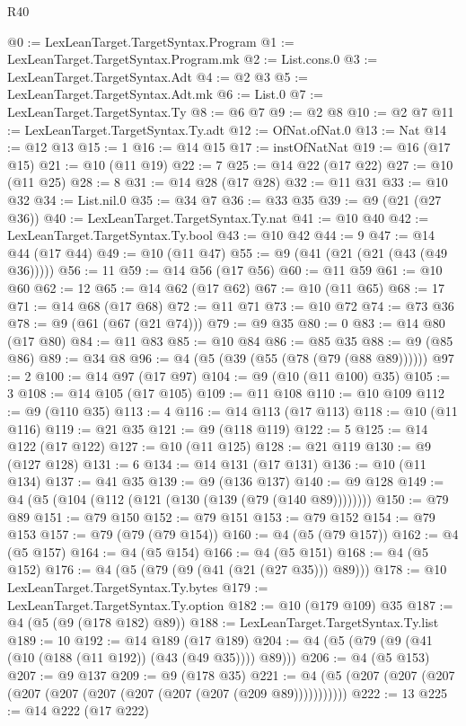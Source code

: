 \begin{lexlean}{R40}
\begin{coremodule}
@0 := LexLeanTarget.TargetSyntax.Program
@1 := LexLeanTarget.TargetSyntax.Program.mk
@2 := List.cons.{0}
@3 := LexLeanTarget.TargetSyntax.Adt
@4 := @2 @3
@5 := LexLeanTarget.TargetSyntax.Adt.mk
@6 := List.{0}
@7 := LexLeanTarget.TargetSyntax.Ty
@8 := @6 @7
@9 := @2 @8
@10 := @2 @7
@11 := LexLeanTarget.TargetSyntax.Ty.adt
@12 := OfNat.ofNat.{0}
@13 := Nat
@14 := @12 @13
@15 := 1
@16 := @14 @15
@17 := instOfNatNat
@19 := @16 (@17 @15)
@21 := @10 (@11 @19)
@22 := 7
@25 := @14 @22 (@17 @22)
@27 := @10 (@11 @25)
@28 := 8
@31 := @14 @28 (@17 @28)
@32 := @11 @31
@33 := @10 @32
@34 := List.nil.{0}
@35 := @34 @7
@36 := @33 @35
@39 := @9 (@21 (@27 @36))
@40 := LexLeanTarget.TargetSyntax.Ty.nat
@41 := @10 @40
@42 := LexLeanTarget.TargetSyntax.Ty.bool
@43 := @10 @42
@44 := 9
@47 := @14 @44 (@17 @44)
@49 := @10 (@11 @47)
@55 := @9 (@41 (@21 (@21 (@43 (@49 @36)))))
@56 := 11
@59 := @14 @56 (@17 @56)
@60 := @11 @59
@61 := @10 @60
@62 := 12
@65 := @14 @62 (@17 @62)
@67 := @10 (@11 @65)
@68 := 17
@71 := @14 @68 (@17 @68)
@72 := @11 @71
@73 := @10 @72
@74 := @73 @36
@78 := @9 (@61 (@67 (@21 @74)))
@79 := @9 @35
@80 := 0
@83 := @14 @80 (@17 @80)
@84 := @11 @83
@85 := @10 @84
@86 := @85 @35
@88 := @9 (@85 @86)
@89 := @34 @8
@96 := @4 (@5 (@39 (@55 (@78 (@79 (@88 @89))))))
@97 := 2
@100 := @14 @97 (@17 @97)
@104 := @9 (@10 (@11 @100) @35)
@105 := 3
@108 := @14 @105 (@17 @105)
@109 := @11 @108
@110 := @10 @109
@112 := @9 (@110 @35)
@113 := 4
@116 := @14 @113 (@17 @113)
@118 := @10 (@11 @116)
@119 := @21 @35
@121 := @9 (@118 @119)
@122 := 5
@125 := @14 @122 (@17 @122)
@127 := @10 (@11 @125)
@128 := @21 @119
@130 := @9 (@127 @128)
@131 := 6
@134 := @14 @131 (@17 @131)
@136 := @10 (@11 @134)
@137 := @41 @35
@139 := @9 (@136 @137)
@140 := @9 @128
@149 := @4 (@5 (@104 (@112 (@121 (@130 (@139 (@79 (@140 @89))))))))
@150 := @79 @89
@151 := @79 @150
@152 := @79 @151
@153 := @79 @152
@154 := @79 @153
@157 := @79 (@79 (@79 @154))
@160 := @4 (@5 (@79 @157))
@162 := @4 (@5 @157)
@164 := @4 (@5 @154)
@166 := @4 (@5 @151)
@168 := @4 (@5 @152)
@176 := @4 (@5 (@79 (@9 (@41 (@21 (@27 @35))) @89)))
@178 := @10 LexLeanTarget.TargetSyntax.Ty.bytes
@179 := LexLeanTarget.TargetSyntax.Ty.option
@182 := @10 (@179 @109) @35
@187 := @4 (@5 (@9 (@178 @182) @89))
@188 := LexLeanTarget.TargetSyntax.Ty.list
@189 := 10
@192 := @14 @189 (@17 @189)
@204 := @4 (@5 (@79 (@9 (@41 (@10 (@188 (@11 @192)) (@43 (@49 @35)))) @89)))
@206 := @4 (@5 @153)
@207 := @9 @137
@209 := @9 (@178 @35)
@221 := @4 (@5 (@207 (@207 (@207 (@207 (@207 (@207 (@207 (@207 (@207 (@209 @89)))))))))))
@222 := 13
@225 := @14 @222 (@17 @222)

\end{coremodule}
\end{lexlean}
